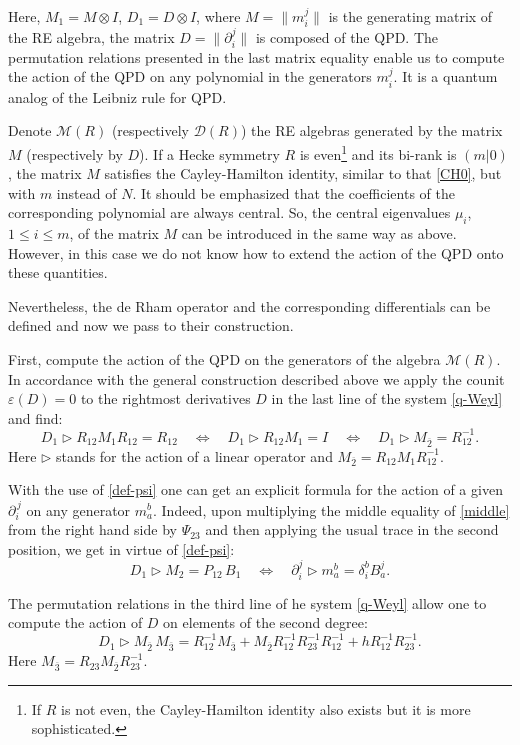 \documentclass[11pt]{article}
\newcommand{\pa}{\partial}
\newcommand{\MM}{\mathcal{M}}
\newcommand{\de}{\delta}
\newcommand{\ov}{\overline}
\newcommand{\DD}{\mathcal{D}}
\numberwithin{equation}{section}
\theoremstyle{plain}
\theoremstyle{definition}
\begin{document}
Here, $M_1 = M\otimes I$, $D_1= D\otimes I$, where $M=\|m_i^j\|$ is the generating matrix of the RE algebra, the matrix
$D=\|\pa_i^j\|$ is composed of the QPD. The permutation relations presented in the last matrix equality enable us to compute
the action of the QPD on any polynomial in the generators $m_i^j$. It is a quantum analog of the Leibniz rule for QPD.

Denote $\MM(R)$ (respectively $\DD(R)$) the RE algebras generated by the matrix $M$ (respectively by $D$). If a Hecke
symmetry $R$ is even\footnote{If $R$ is not even, the Cayley-Hamilton identity also exists but it is more sophisticated.} and its
bi-rank is $(m|0)$, the  matrix $M$ satisfies the Cayley-Hamilton identity, similar to that \eqref{CH0}, but with $m$ instead of $N$.
It should be emphasized that the coefficients of the corresponding polynomial are always central. So, the central eigenvalues
$\mu_i$, $1\le i\le m$, of the matrix $M$ can be introduced in the same way as above. However, in this case we do not know
how to extend the action of the QPD onto these quantities.

Nevertheless, the de Rham operator and the corresponding differentials can be defined and now we pass to their construction.

First, compute the action of the QPD on the generators of the algebra $\MM(R)$. In accordance with the general construction
described above we apply the counit $\varepsilon(D) = 0$ to the rightmost derivatives $D$ in the last line of the
system  \eqref{q-Weyl} and find:
\begin{equation}
D_1\triangleright R_{12} M_1R_{12} = R_{12} \quad  \Leftrightarrow \quad D_1\triangleright R_{12} M_1= I \quad
\Leftrightarrow \quad D_1\triangleright M_{\ov 2}=R_{12}^{-1}.
\label{middle}
\end{equation}
Here $\triangleright$ stands for the action of a linear operator and $M_{\overline 2} = R_{12}M_1R_{12}^{-1}$.

With the use of \eqref{def-psi} one can get an explicit formula for the action of a given $\partial_i^{\,j}$ on any generator $m_a^b$.
Indeed, upon multiplying the middle equality of \eqref{middle} from the right hand side by $\Psi_{23}$
and then applying the usual trace in the second position, we get in virtue of \eqref{def-psi}:
\[
D_1 \triangleright M_2=P_{12}\, B_1 \quad \Leftrightarrow \quad \pa_i^j\triangleright m_a^b=\de_i^b B_a^j.
\]

The permutation relations in the third line of he system \eqref{q-Weyl} allow one to compute the action of $D$ on elements of
the second degree:
\begin{equation}
D_1\triangleright M_{\ov 2}\, M_{\ov 3}=R_{12}^{-1} M_{\ov 3}+M_{\ov 2}R_{12}^{-1} R_{23}^{-1}R_{12}^{-1}+
h R_{12}^{-1}R_{23}^{-1}.
\label{secdeg}
\end{equation}
Here $M_{\overline 3} = R_{23}M_{\overline 2}R_{23}^{-1}.$
\end{document}
